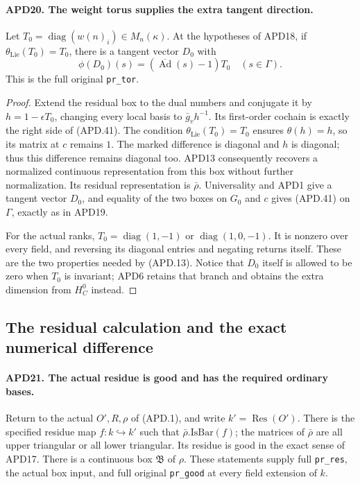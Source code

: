 \documentclass[11pt,a4paper]{article}
\numberwithin{equation}{section}
\theoremstyle{remark}\newtheorem{remark}[theorem]{Remark}
\begin{document}
\paragraph{APD20. The weight torus supplies the extra tangent direction.}
\label{claim:APD20}
Let
\(T_0=\operatorname{diag}(w(n)_i)\in M_n(\kappa)\).
At the hypotheses of APD18, if
\(\theta_{\mathrm{Lie}}(T_0)=T_0\), there is a tangent
vector \(D_0\) with
\[
       \phi(D_0)(s)=(\overline{\operatorname{Ad}}(s)-1)T_0
                         \quad(s\in\Gamma).             \tag{APD.41}
\]
This is the full original \texttt{pr\_\allowbreak tor}.

\begin{proof}
Extend the residual box to the dual numbers and conjugate it by
\(h=1-\epsilon T_0\), changing every local basis to
\(\bar g_vh^{-1}\).  Its first-order cochain is exactly the
right side of (APD.41).  The condition
\(\theta_{\mathrm{Lie}}(T_0)=T_0\) ensures
\(\theta(h)=h\), so its matrix at \(c\) remains \(1\).
The marked difference is diagonal and \(h\) is diagonal;
thus this difference remains diagonal too.  APD13 consequently
recovers a normalized continuous representation from this box
without further normalization.  Its residual representation is
\(\bar\rho\).  Universality and APD1 give a tangent vector
\(D_0\), and equality of the two boxes on \(G_0\) and \(c\)
gives (APD.41) on \(\Gamma\), exactly as in APD19.

For the actual ranks, \(T_0=\operatorname{diag}(1,-1)\) or
\(\operatorname{diag}(1,0,-1)\).  It is nonzero over every
field, and reversing its diagonal entries and negating returns
itself.  These are the two properties needed by (APD.13).
Notice that \(D_0\) itself is allowed to be zero when
\(T_0\) is invariant; APD6 retains that branch and obtains
the extra dimension from \(H_C^0\) instead.
\end{proof}

\subsection{The residual calculation and the exact numerical difference}

\paragraph{APD21. The actual residue is good and has the required ordinary bases.}
\label{claim:APD21}
Return to the actual \(O',R,\rho\) of (APD.1), and write
\(k'=\operatorname{Res}(O')\).  There is the specified residue
map \(f:k\hookrightarrow k'\) such that
\(\bar\rho.\mathrm{IsBar}(f)\); the matrices of \(\bar\rho\)
are all upper triangular or all lower triangular.  Its residue is
good in the exact sense of APD17.  There is a continuous box
\(\mathfrak B\) of \(\rho\).  These statements supply full
\texttt{pr\_\allowbreak res}, the actual box input, and full original
\texttt{pr\_\allowbreak good} at every field extension of \(k\).
\end{document}
